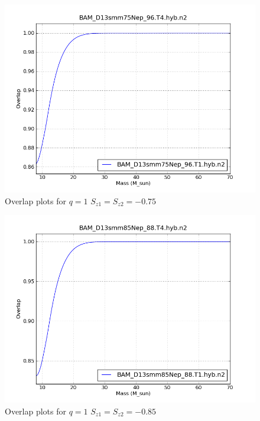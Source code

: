 \begin{figure}
  \includegraphics[width=\linewidth]{figures/ninja2/figure_1_-0d75_01.png}
  \caption[Overlap plots for $q=1$ $S_{z1} = S_{z2} = -0.75$]{
  \label{f:figure_1_-0d75}
Overlap plots for $q=1$ $S_{z1} = S_{z2} = -0.75$}
\end{figure}%


\begin{figure}
  \includegraphics[width=\linewidth]{figures/ninja2/figure_1_-0d85_01.png}
  \caption[Overlap plots for $q=1$ $S_{z1} = S_{z2} = -0.85$]{
  \label{f:figure_1_-0d85}
Overlap plots for $q=1$ $S_{z1} = S_{z2} = -0.85$}
\end{figure}%


